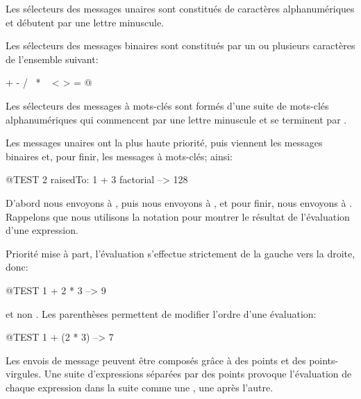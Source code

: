 \documentclass[a4paper,10pt,twoside]{book}
\begin{document}
Les s\'{e}lecteurs des messages unaires sont constitu\'{e}s de caract\`{e}res alphanum\'{e}riques et d\'{e}butent par une lettre minuscule. 

Les s\'{e}lecteurs des messages binaires sont constitu\'{e}s par un ou plusieurs caract\`{e}res de l'ensemble suivant:
\begin{code}{}
+ - / \ * ~ < > = @ %
\end{code}
\noindent

Les s\'{e}lecteurs des messages \`{a} mots-cl\'{e}s sont form\'{e}s d'une suite de mots-cl\'{e}s alphanum\'{e}riques qui commencent par une lettre minuscule et se terminent par \lct{:}.

Les messages unaires ont la plus haute priorit\'{e}, puis viennent les messages binaires et, pour finir, les messages \`{a} mots-cl\'{e}s; ainsi:
\begin{code}{@TEST}
2 raisedTo: 1 + 3 factorial --> 128
\end{code}
D'abord nous envoyons  \`{a} , puis nous envoyons  \`{a} , et pour finir, nous envoyons  \`{a} .  
Rappelons que nous utilisons la notation \ct{-->} pour montrer le r\'{e}sultat de l'\'{e}valuation d'une expression. 

Priorit\'{e} mise \`{a} part, l'\'{e}valuation s'effectue strictement de la gauche vers la droite, donc: 
\begin{code}{@TEST}
1 + 2 * 3 --> 9
\end{code}
et non .
Les parenth\`{e}ses permettent de modifier l'ordre d'une \'{e}valuation:
\begin{code}{@TEST}
1 + (2 * 3) --> 7
\end{code}
Les envois de message peuvent \^{e}tre compos\'{e}s gr\^{a}ce \`{a} des points et des points-virgules. Une suite d'expressions s\'{e}par\'{e}es par des points provoque  l'\'{e}valuation de chaque expression dans la suite comme une , une apr\`{e}s l'autre. 
\end{document}
